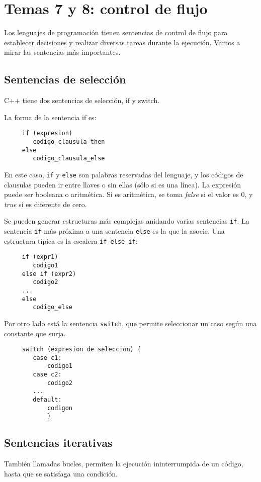 \documentclass[a4paper]{article}
\begin{document}
	 
	 
	 \section{Temas 7 y 8: control de flujo}
	 
	 Los lenguajes de programación tienen sentencias de control de flujo para establecer decisiones y realizar diversas tareas durante la ejecución. Vamos a mirar las sentencias más importantes.
	 
	 \subsection{Sentencias de selección}
	 C++ tiene dos sentencias de selección, if y switch.
	 
	 La forma de la sentencia if es:
	 \begin{lstlisting}
	 if (expresion)
	 	codigo_clausula_then
	 else
	 	codigo_clausula_else
	 \end{lstlisting}
	 
	 En este caso, \verb|if| y \verb|else| son palabras reservadas del lenguaje, y los códigos de clausulas pueden ir entre llaves o sin ellas (sólo si es una línea). La expresión puede ser booleana o aritmética. Si es aritmética, se toma \textit{false} si el valor es 0, y \textit{true} si es diferente de cero.
	 
     Se pueden generar estructuras más complejas anidando varias sentencias \verb|if|. La sentencia \verb|if| más próxima a una sentencia \verb|else| es la que la asocie. Una estructura típica es la escalera \verb|if-else-if|:
     
     \begin{lstlisting}
     if (expr1)
     	codigo1
     else if (expr2)
     	codigo2
     ...
     else
     	codigo_else
     \end{lstlisting}
	 
	 Por otro lado está la sentencia \verb|switch|, que permite seleccionar un caso según una constante que surja.
	 \begin{lstlisting}
	 switch (expresion de seleccion) {
	 	case c1:
	 		codigo1
	 	case c2:
	 		codigo2
	 	...
	 	default:
	 		codigon
	 		}
	 \end{lstlisting}
	 
	 \subsection{Sentencias iterativas}
	 También llamadas bucles, permiten la ejecución ininterrumpida de un código, hasta que se satisfaga una condición.
	 
\end{document}
